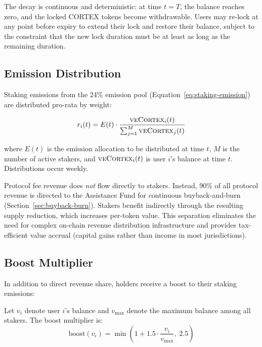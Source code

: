 The decay is continuous and deterministic: at time $t = T$, the \veCORTEX{}
balance reaches zero, and the locked CORTEX tokens become withdrawable. Users
may re-lock at any point before expiry to extend their lock and restore their
\veCORTEX{} balance, subject to the constraint that the new lock duration
must be at least as long as the remaining duration.

\subsection{Emission Distribution}
\label{subsec:revenue-dist}

Staking emissions from the 24\% emission pool
(Equation~\eqref{eq:staking-emission}) are distributed pro-rata by \veCORTEX{}
weight:

\begin{equation}
  r_i(t) = E(t) \cdot \frac{\textsc{veCortex}_i(t)}{\sum_{j=1}^{M} \textsc{veCortex}_j(t)}
  \label{eq:revenue-pro-rata}
\end{equation}

where $E(t)$ is the emission allocation to be distributed at time $t$, $M$ is
the number of active stakers, and $\textsc{veCortex}_i(t)$ is user $i$'s \veCORTEX{}
balance at time $t$. Distributions occur weekly.

Protocol fee revenue does \emph{not} flow directly to stakers. Instead, 90\%
of all protocol revenue is directed to the Assistance Fund for continuous
buyback-and-burn (Section~\ref{sec:buyback-burn}). Stakers benefit indirectly
through the resulting supply reduction, which increases per-token value. This
separation eliminates the need for complex on-chain revenue distribution
infrastructure and provides tax-efficient value accrual (capital gains rather
than income in most jurisdictions).

\subsection{Boost Multiplier}
\label{subsec:boost}

In addition to direct revenue share, \veCORTEX{} holders receive a boost to
their staking emissions:

\begin{definition}
\label{def:boost}
Let $v_i$ denote user $i$'s \veCORTEX{} balance and $v_{\max}$ denote the
maximum \veCORTEX{} balance among all stakers. The boost multiplier is:
\begin{equation}
  \text{boost}(v_i) = \min\!\left(1 + 1.5 \cdot \frac{v_i}{v_{\max}},\; 2.5\right)
  \label{eq:boost}
\end{equation}
\end{definition}


